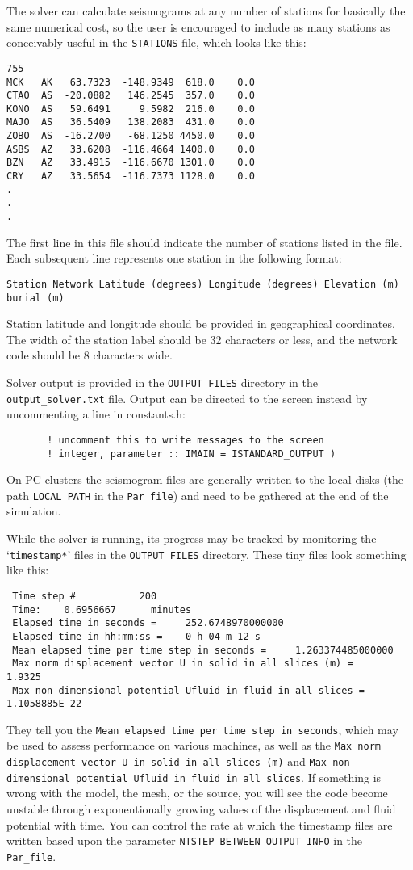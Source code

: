\documentclass[onecolumn]{article}
\begin{document}
The solver can calculate seismograms at any number of stations for
basically the same numerical cost, so the user is encouraged to
include as many stations as conceivably useful in the \texttt{STATIONS} file,
which looks like this:
\begin{verbatim}
755
MCK   AK   63.7323  -148.9349  618.0    0.0
CTAO  AS  -20.0882   146.2545  357.0    0.0
KONO  AS   59.6491     9.5982  216.0    0.0
MAJO  AS   36.5409   138.2083  431.0    0.0
ZOBO  AS  -16.2700   -68.1250 4450.0    0.0
ASBS  AZ   33.6208  -116.4664 1400.0    0.0
BZN   AZ   33.4915  -116.6670 1301.0    0.0
CRY   AZ   33.5654  -116.7373 1128.0    0.0
.
.
.
\end{verbatim}
The first line in this file should indicate the number of stations listed
in the file.
Each subsequent line represents one station in the following format:
\begin{verbatim}
Station Network Latitude (degrees) Longitude (degrees) Elevation (m) burial (m)
\end{verbatim}
Station latitude and longitude should be provided in geographical coordinates.
The width of the station label should be 32 characters or less,
and the network code should be 8 characters wide.

Solver output is provided in the \texttt{OUTPUT\_FILES} directory in
the \texttt{output\_solver.txt} file.
Output can be directed to the screen instead by uncommenting a line in constants.h:
\begin{verbatim}
       ! uncomment this to write messages to the screen
       ! integer, parameter :: IMAIN = ISTANDARD_OUTPUT )
\end{verbatim}
On PC clusters the seismogram files are generally written to the
local disks (the path \texttt{LOCAL\_PATH} in the \texttt{Par\_file})
and need to be gathered at the end of the simulation.

While the solver is running, its progress may be tracked by monitoring the
`\texttt{timestamp*}' files in the \texttt{OUTPUT\_FILES} directory.
These tiny files look something like this:
\begin{verbatim}
 Time step #           200
 Time:    0.6956667      minutes
 Elapsed time in seconds =     252.6748970000000
 Elapsed time in hh:mm:ss =    0 h 04 m 12 s
 Mean elapsed time per time step in seconds =     1.263374485000000
 Max norm displacement vector U in solid in all slices (m) =       1.9325
 Max non-dimensional potential Ufluid in fluid in all slices =    1.1058885E-22
\end{verbatim}
They tell you the \texttt{Mean elapsed time per time step in seconds},
which may be used to assess performance on various machines,
as well as the \texttt{Max norm displacement vector U in solid in all slices (m)}
and
\texttt{Max non-dimensional potential Ufluid in fluid in all slices}.
If something is wrong with the model, the mesh, or the source, you will
see the code become unstable through exponentionally growing
values of the displacement and fluid potential with time.
You can control the rate at which the timestamp files are written
based upon the parameter \texttt{NTSTEP\_BETWEEN\_OUTPUT\_INFO}
in the \texttt{Par\_file}.
\end{document}
